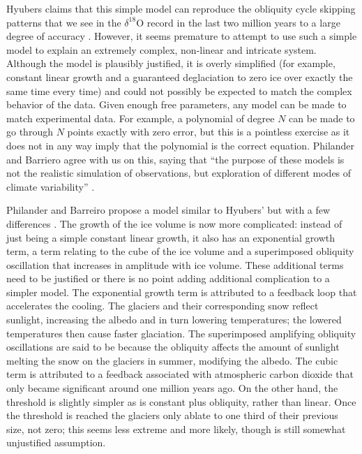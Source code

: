 \documentclass[11pt]{article}
\begin{document}
Hyubers claims that this simple model can reproduce the obliquity cycle skipping patterns that we see in the $\delta^{18}$O record in the last two million years to a large degree of accuracy \cite{hyubers}.
However, it seems premature to attempt to use such a simple model to explain an extremely complex, non-linear and intricate system.
Although the model is plausibly justified, it is overly simplified (for example, constant linear growth and a guaranteed deglaciation to zero ice over exactly the same time every time) and could not possibly be expected to match the complex behavior of the data.
Given enough free parameters, any model can be made to match experimental data.
For example, a polynomial of degree $N$ can be made to go through $N$ points exactly with zero error, but this is a pointless exercise as it does not in any way imply that the polynomial is the correct equation.
Philander and Barriero agree with us on this, saying that ``the purpose of these models is not the realistic simulation of observations, but exploration of different modes of climate variability'' \cite{philander}.

Philander and Barreiro propose a model similar to Hyubers' but with a few differences \cite{philander}.
The growth of the ice volume is now more complicated: instead of just being a simple constant linear growth, it also has an exponential growth term, a term relating to the cube of the ice volume and a superimposed obliquity oscillation that increases in amplitude with ice volume.
These additional terms need to be justified or there is no point adding additional complication to a simpler model.
The exponential growth term is attributed to a feedback loop that accelerates the cooling.
The glaciers and their corresponding snow reflect sunlight, increasing the albedo and in turn lowering temperatures; the lowered temperatures then cause faster glaciation.
The superimposed amplifying obliquity oscillations are said to be because the obliquity affects the amount of sunlight melting the snow on the glaciers in summer, modifying the albedo.
The cubic term is attributed to a feedback associated with atmospheric carbon dioxide that only became significant around one million years ago.
On the other hand, the threshold is slightly simpler as is constant plus obliquity, rather than linear.
Once the threshold is reached the glaciers only ablate to one third of their previous size, not zero; this seems less extreme and more likely, though is still somewhat unjustified assumption.
\end{document}
